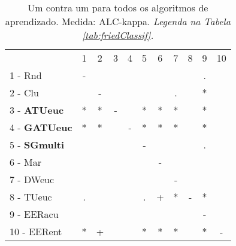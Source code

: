 \begin{table}[h]
\caption{Um contra um para todos os algoritmos de aprendizado. Medida: ALC-kappa. \textit{Legenda na Tabela \ref{tab:friedClassif}.}}
\begin{center}\begin{tabular}{lcc|cc|cc|cc|cc}
 			& 1 & 2 & 3 & 4 & 5 & 6 & 7 & 8 & 9 & 10\\
1 - Rnd  	& - &   &   &   &   &   &   &   & . &   \\
2 - Clu  	&   & - &   &   &   &   & . &   & * &   \\ \hline
3 - \textbf{ATUeuc}	& * & * & - &   & * & * & * &   & * &   \\
4 - \textbf{GATUeuc}	& * & * &   & - & * & * & * &   & * &   \\ \hline
5 - \textbf{SGmulti}	&   &   &   &   & - &   &   &   & . &   \\
6 - Mar  	&   &   &   &   &   & - &   &   &   &   \\ \hline
7 - DWeuc	&   &   &   &   &   &   & - &   &   &   \\
8 - TUeuc	& . &   &   &   & . & + & * & - & * &   \\ \hline
9 - EERacu	&   &   &   &   &   &   &   &   & - &   \\
10 - EERent	& * & + &   &   & * & * & * &   & * & - \\ \hline\end{tabular}
\label{stratsALCKappaFriedAllReduxall}
\end{center}
\end{table}